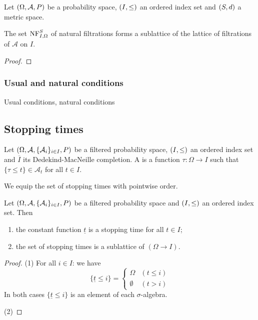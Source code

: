 \begin{proposition}
Let $\sSet{\Omega, \mathcal{A}, P}$ be a probability space, $\sSet{I,\leq}$ an ordered index set and $\sSet{S,d}$ a metric space.

The set $\operatorname{NF}_{I,\Omega}^S$ of natural filtrations forms a sublattice of the lattice of filtrations of $\mathcal{A}$ on $I$.
\end{proposition}
\begin{proof}

\end{proof}

\subsubsection{Usual and natural conditions}
\begin{definition}
Usual conditions, natural conditions
\end{definition}

\subsection{Stopping times}
\begin{definition}
Let $\sSet{\Omega, \mathcal{A}, \{\mathcal{A}_i\}_{i\in I}, P}$ be a filtered probability space, $\sSet{I,\leq}$ an ordered index set and $\overline{I}$ its Dedekind-MacNeille completion. A  is a function $\tau: \Omega \to I$ such that $\{\tau \leq t\} \in \mathcal{A}_t$ for all $t\in I$.
\end{definition}

We equip the set of stopping times with pointwise order.

\begin{lemma}
Let $\sSet{\Omega, \mathcal{A}, \{\mathcal{A}_i\}_{i\in I}, P}$ be a filtered probability space and $\sSet{I,\leq}$ an ordered index set. Then
\begin{enumerate}
\item the constant function $\underline{t}$ is a stopping time for all $t\in I$;
\item the set of stopping times is a sublattice of $(\Omega\to I)$.
\end{enumerate}
\end{lemma}
\begin{proof}
(1) For all $i\in I$: we have
\[ \{\underline{t} \leq i\} = \begin{cases}
\Omega & (t\leq i) \\
\emptyset & (t > i)
\end{cases} \]
In both cases $\{\underline{t} \leq i\}$ is an element of each $\sigma$-algebra.

(2)
\end{proof}

